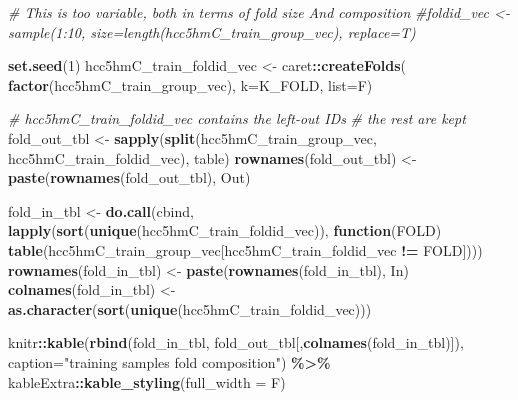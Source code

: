 \documentclass[
]{book}
\newenvironment{Shaded}{\begin{snugshade}}{\end{snugshade}}
\newcommand{\CommentTok}[1]{\textcolor[rgb]{0.56,0.35,0.01}{\textit{#1}}}
\newcommand{\ControlFlowTok}[1]{\textcolor[rgb]{0.13,0.29,0.53}{\textbf{#1}}}
\newcommand{\DataTypeTok}[1]{\textcolor[rgb]{0.13,0.29,0.53}{#1}}
\newcommand{\DecValTok}[1]{\textcolor[rgb]{0.00,0.00,0.81}{#1}}
\newcommand{\KeywordTok}[1]{\textcolor[rgb]{0.13,0.29,0.53}{\textbf{#1}}}
\newcommand{\NormalTok}[1]{#1}
\newcommand{\OperatorTok}[1]{\textcolor[rgb]{0.81,0.36,0.00}{\textbf{#1}}}
\newcommand{\StringTok}[1]{\textcolor[rgb]{0.31,0.60,0.02}{#1}}
\begin{document}
\begin{Shaded}
\begin{Highlighting}[]
\CommentTok{\# This is too variable, both in terms of fold size And composition}
\CommentTok{\#foldid\_vec <{-} sample(1:10, size=length(hcc5hmC\_train\_group\_vec), replace=T)}

\KeywordTok{set.seed}\NormalTok{(}\DecValTok{1}\NormalTok{)}
\NormalTok{hcc5hmC\_train\_foldid\_vec <{-}}\StringTok{ }\NormalTok{caret}\OperatorTok{::}\KeywordTok{createFolds}\NormalTok{(}
 \KeywordTok{factor}\NormalTok{(hcc5hmC\_train\_group\_vec), }
 \DataTypeTok{k=}\NormalTok{K\_FOLD,}
 \DataTypeTok{list=}\NormalTok{F)}

\CommentTok{\# hcc5hmC\_train\_foldid\_vec contains the left{-}out IDs }
\CommentTok{\# the rest are kept}
\NormalTok{fold\_out\_tbl <{-}}\StringTok{ }\KeywordTok{sapply}\NormalTok{(}\KeywordTok{split}\NormalTok{(hcc5hmC\_train\_group\_vec, hcc5hmC\_train\_foldid\_vec),}
\NormalTok{  table)}
\KeywordTok{rownames}\NormalTok{(fold\_out\_tbl) <{-}}\StringTok{ }\KeywordTok{paste}\NormalTok{(}\KeywordTok{rownames}\NormalTok{(fold\_out\_tbl), }\StringTok{\textquotesingle{}{-} Out\textquotesingle{}}\NormalTok{) }

\NormalTok{fold\_in\_tbl <{-}}\StringTok{ }\KeywordTok{do.call}\NormalTok{(}\StringTok{\textquotesingle{}cbind\textquotesingle{}}\NormalTok{, }\KeywordTok{lapply}\NormalTok{(}\KeywordTok{sort}\NormalTok{(}\KeywordTok{unique}\NormalTok{(hcc5hmC\_train\_foldid\_vec)),}
  \ControlFlowTok{function}\NormalTok{(FOLD) }\KeywordTok{table}\NormalTok{(hcc5hmC\_train\_group\_vec[hcc5hmC\_train\_foldid\_vec }\OperatorTok{!=}\StringTok{ }\NormalTok{FOLD])))}
\KeywordTok{rownames}\NormalTok{(fold\_in\_tbl) <{-}}\StringTok{ }\KeywordTok{paste}\NormalTok{(}\KeywordTok{rownames}\NormalTok{(fold\_in\_tbl), }\StringTok{\textquotesingle{}{-} In\textquotesingle{}}\NormalTok{) }
\KeywordTok{colnames}\NormalTok{(fold\_in\_tbl) <{-}}\StringTok{ }\KeywordTok{as.character}\NormalTok{(}\KeywordTok{sort}\NormalTok{(}\KeywordTok{unique}\NormalTok{(hcc5hmC\_train\_foldid\_vec)))}


\NormalTok{knitr}\OperatorTok{::}\KeywordTok{kable}\NormalTok{(}\KeywordTok{rbind}\NormalTok{(fold\_in\_tbl, fold\_out\_tbl[,}\KeywordTok{colnames}\NormalTok{(fold\_in\_tbl)]),}
  \DataTypeTok{caption=}\StringTok{"training samples fold composition"}\NormalTok{) }\OperatorTok{\%>\%}
\StringTok{   }\NormalTok{kableExtra}\OperatorTok{::}\KeywordTok{kable\_styling}\NormalTok{(}\DataTypeTok{full\_width =}\NormalTok{ F)}
\end{Highlighting}
\end{Shaded}
\end{document}
